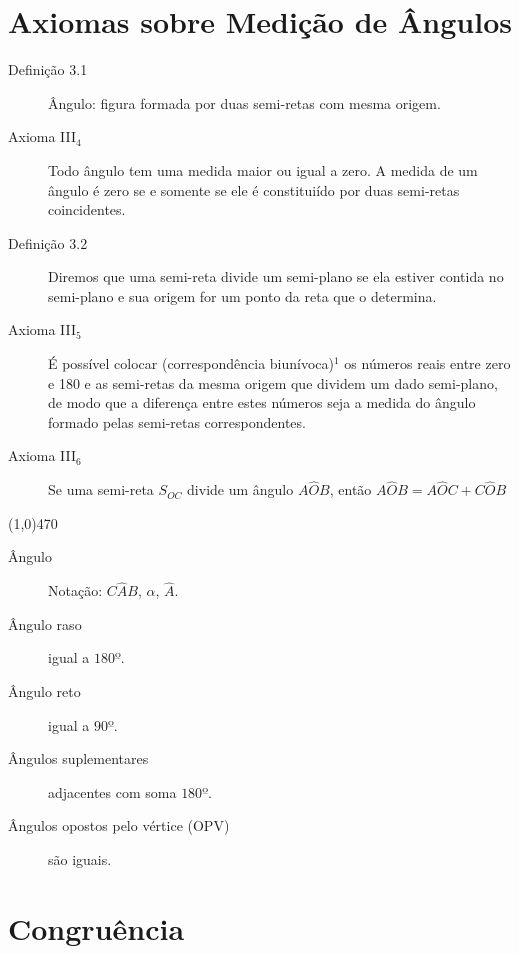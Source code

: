 \documentclass[11pt]{article}
\begin{document}
\section{Axiomas sobre Medição de Ângulos}

\begin{description}
  \item[Definição 3.1] Ângulo: figura formada por duas semi-retas com mesma
    origem.

  \item[Axioma III$_{4}$] Todo ângulo tem uma medida maior ou igual a zero. A
    medida de um ângulo é zero se e somente se ele é constituiído por duas
    semi-retas coincidentes.

  \item[Definição 3.2] Diremos que uma semi-reta divide um semi-plano se ela
    estiver contida no semi-plano e sua origem for um ponto da reta que o
    determina.

  \item[Axioma III$_{5}$] É possível colocar (correspondência biunívoca)$^1$
    os números reais entre zero e 180 e as semi-retas da mesma origem que
    dividem um dado semi-plano, de modo que a diferença entre estes números
    seja a medida do ângulo formado pelas semi-retas correspondentes.

  \item[Axioma III$_6$] Se uma semi-reta $S_{OC}$ divide um ângulo $A\hat{O}B$,
    então $A\hat{O}B = A\hat{O}C + C\hat{O}B$
\end{description}

\line(1,0){470}

\begin{description}
  \item[Ângulo] Notação: $C\hat{A}B$, $\alpha$, $\hat{A}$.
  \item[Ângulo raso] igual a $180º$.
  \item[Ângulo reto] igual a $90º$.
  \item[Ângulos suplementares] adjacentes com soma $180º$.
  \item[Ângulos opostos pelo vértice (OPV)] são iguais.
\end{description}

\section{Congruência}
\end{document}
